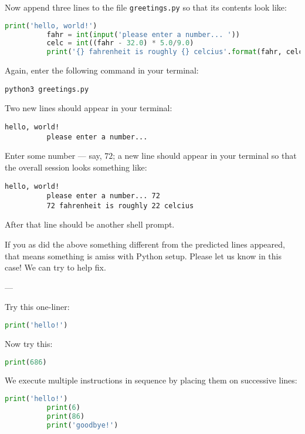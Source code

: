 \documentclass[11pt, justified]{tufte-book}
\newcommand{\samsubsection}[1]{
  \vspace{0.3cm}
  \par\noindent{\Large \sf \bre #1}
  \vspace{0.1cm}\par
}
\newcommand{\samsubsubsection}[1]{
   \vspace{0.1cm}
   \par\noindent{\hspace{-2cm}\normalsize \sc \gre #1} ---
}
\theoremstyle{definition}
\begin{document}
        Now append three lines to the file \texttt{greetings.py} so that its
        contents look like:
        \begin{lstlisting}[language=Python, basicstyle=\footnotesize\ttfamily]
          print('hello, world!')
          fahr = int(input('please enter a number... '))
          celc = int((fahr - 32.0) * 5.0/9.0)
          print('{} fahrenheit is roughly {} celcius'.format(fahr, celc))
        \end{lstlisting}
        Again, enter the following command in your terminal:
        \begin{lstlisting}[basicstyle=\footnotesize\ttfamily]
          python3 greetings.py
        \end{lstlisting}
        Two new lines should appear in your terminal:
        \begin{lstlisting}[basicstyle=\footnotesize\ttfamily]
          hello, world!
          please enter a number...
        \end{lstlisting}
        Enter some number --- say, $72$; a new line should appear in your
        terminal so that the overall session looks something like:
        \begin{lstlisting}[basicstyle=\footnotesize\ttfamily]
          hello, world!
          please enter a number... 72
          72 fahrenheit is roughly 22 celcius 
        \end{lstlisting}
        After that line should be another shell prompt.

        If you as did the above something different from the predicted lines
        appeared, that means something is amiss with Python setup. 
        Please let us know in this case!  We can try to help fix. 

    \newpage
    \samsubsection{python basics}

      \samsubsubsection{output and sequencing}
        Try this one-liner:
        \begin{lstlisting}[language=Python, basicstyle=\footnotesize\ttfamily]
          print('hello!')
        \end{lstlisting}
        Now try this:
        \begin{lstlisting}[language=Python, basicstyle=\footnotesize\ttfamily]
          print(686)
        \end{lstlisting}
        We execute multiple instructions in sequence by placing them on
        successive lines:
        \begin{lstlisting}[language=Python, basicstyle=\footnotesize\ttfamily]
          print('hello!')
          print(6)
          print(86)
          print('goodbye!')
        \end{lstlisting}
\end{document}

